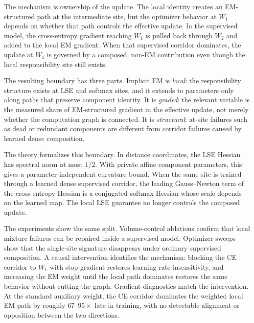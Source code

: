 The mechanism is ownership of the update. The local identity creates an
EM-structured path at the intermediate site, but the optimizer behavior at
$W_1$ depends on whether that path controls the effective update. In the
supervised model, the cross-entropy gradient reaching $W_1$ is pulled back
through $W_2$ and added to the local EM gradient. When that supervised
corridor dominates, the update at $W_1$ is governed by a composed, non-EM
contribution even though the local responsibility site still exists.

The resulting boundary has three parts. Implicit EM is \emph{local}: the
responsibility structure exists at LSE and softmax sites, and it extends to
parameters only along paths that preserve component identity. It is
\emph{graded}: the relevant variable is the measured share of EM-structured
gradient in the effective update, not merely whether the computation graph is
connected. It is \emph{structural}: at-site failures such as dead or redundant
components are different from corridor failures caused by learned dense
composition.

The theory formalizes this boundary. In distance coordinates, the LSE Hessian
has spectral norm at most $1/2$. With private affine component parameters,
this gives a parameter-independent curvature bound. When the same site is
trained through a learned dense supervised corridor, the leading
Gauss--Newton term of the cross-entropy Hessian is a conjugated softmax
Hessian whose scale depends on the learned map. The local LSE guarantee no
longer controls the composed update.

The experiments show the same split. Volume-control ablations confirm that
local mixture failures can be repaired inside a supervised model. Optimizer
sweeps show that the single-site signature disappears under ordinary
supervised composition. A causal intervention identifies the mechanism:
blocking the CE corridor to $W_1$ with stop-gradient restores learning-rate
insensitivity, and increasing the EM weight until the local path dominates
restores the same behavior without cutting the graph. Gradient diagnostics
match the intervention. At the standard auxiliary weight, the CE corridor
dominates the weighted local EM path by roughly $67$--$95\times$ late in
training, with no detectable alignment or opposition between the two
directions.

